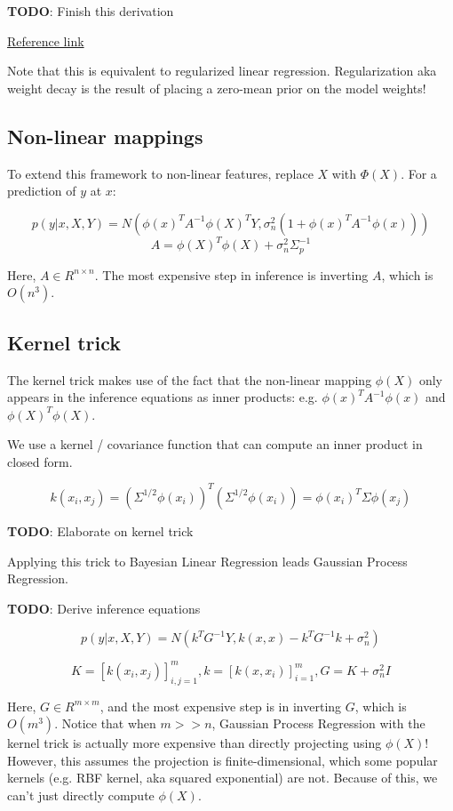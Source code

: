 \documentclass[a4paper]{article}
\begin{document}
\textbf{TODO}: Finish this derivation

\href{https://www.cs.utah.edu/~fletcher/cs6957/lectures/BayesianLinearRegression.pdf}{Reference link }

Note that this is equivalent to regularized linear regression. Regularization aka weight decay is the result of placing a zero-mean prior on the model weights! 

\subsection{Non-linear mappings}

To extend this framework to non-linear features, replace $X$ with $\Phi(X)$. For a prediction of $y$ at $x$: 

$$p(y | x, X, Y) = N(\phi(x)^T A^{-1} \phi(X)^T Y, \sigma_n^2 (1 +\phi(x)^T A^{-1} \phi(x)))$$
$$A = \phi(X)^T \phi(X) + \sigma_n^2 \Sigma_p^{-1}$$

Here, $A \in R^{n \times n}$. The most expensive step in inference is inverting $A$, which is $O(n^3)$. 

\subsection{Kernel trick}

The kernel trick makes use of the fact that the non-linear mapping $\phi(X)$ only appears in the inference equations as inner products: e.g. $\phi(x)^T A^{-1}\phi(x)$ and $\phi(X)^T \phi(X)$. 

We use a kernel / covariance function that can compute an inner product in closed form.

$$k(x_i, x_j) = (\Sigma^{1/2} \phi(x_i))^T (\Sigma^{1/2} \phi(x_i)) = \phi(x_i)^T \Sigma \phi(x_j)$$

\textbf{TODO}: Elaborate on kernel trick

Applying this trick to Bayesian Linear Regression leads Gaussian Process Regression.

\textbf{TODO}: Derive inference equations

$$p(y | x, X, Y) = N(k^T G^{-1}Y, k(x, x) - k^T G^{-1}k + \sigma_n^2)$$

$$K= [k(x_i, x_j)]_{i,j=1}^m, k = [k(x, x_i)]_{i=1}^m, G = K+\sigma_n^2 I$$ 

Here, $G \in R^{m \times m}$, and the most expensive step is in inverting $G$, which is $O(m^3)$. Notice that when $m>>n$, Gaussian Process Regression with the kernel trick is actually more expensive than directly projecting using $\phi(X)$! However, this assumes the projection is finite-dimensional, which some popular kernels (e.g. RBF kernel, aka squared exponential) are not. Because of this, we can't just directly compute $\phi(X)$.  
\end{document}

